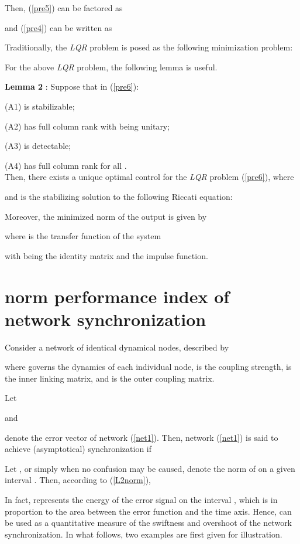 \documentclass[11pt]{article}
\def\dref#1{(\ref{#1})}
\begin{document}
Then, \dref{pre5} can be factored as

and \dref{pre4} can be written as

Traditionally, the \textit{LQR} problem is posed as the following
minimization problem:



For the above \textit{LQR} problem, the following lemma is useful.


\textbf{Lemma 2 } \cite{zhou96}: Suppose that in \dref{pre6}:

(A1)  is stabilizable;

(A2)  has full column rank with  being unitary;

(A3)  is detectable;

(A4)  has full column rank for all .\\
Then, there exists a unique optimal control  for the
\textit{LQR} problem \dref{pre6}, where

and  is the stabilizing solution to the following Riccati
equation:

Moreover, the minimized  norm of the output  is given by

where  is the transfer function of the system

with  being the identity matrix and  the impulse
function.

\section{ norm performance index of network synchronization}

\quad Consider a network of  identical dynamical nodes, described
by

where  governs the dynamics of each individual node, 
is the coupling strength,  is the inner linking matrix, and
 is the outer coupling matrix.

Let

and

denote the error vector of network \dref{net1}. Then, network
\dref{net1} is said to achieve (asymptotical) synchronization if


Let , or simply  when no confusion
may be caused, denote the  norm of  on a given interval
. Then, according to \dref{L2norm},


In fact,  represents the energy of the error signal 
on the interval , which is in proportion to the area between
the error function  and the time axis. Hence,  can be
used as a quantitative measure of the swiftness and overshoot of the
network synchronization. In what follows, two examples are first
given for illustration.
\end{document}
